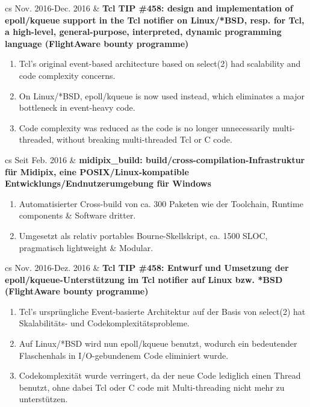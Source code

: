 \documentclass{article}
\begin{document}
\begin{table}
{\begin{enumerate}
    \end{enumerate}
    \begin{tabularx}{\linewidth}{cs}
      Nov. 2016-Dec. 2016 & \bf{Tcl TIP \#458: design and implementation of epoll/kqueue support in the Tcl notifier on Linux/*BSD, resp. for Tcl, a high-level, general-purpose, interpreted, dynamic programming language (FlightAware bounty programme)}
    \end{tabularx}
    \begin{enumerate}
      \item Tcl's original event-based architecture based on select(2) had scalability and code complexity concerns.
      \item On Linux/*BSD, epoll/kqueue is now used instead, which eliminates a major bottleneck in event-heavy code.
      \item Code complexity was reduced as the code is no longer unnecessarily multi-threaded, without breaking multi-threaded Tcl or C code.
    \end{enumerate}
  }{
    \caption{Projektbeteiligungen}
    \begin{tabularx}{\linewidth}{cs}
      Seit Feb. 2016 & \bf{midipix\_build: build/cross-compilation-Infrastruktur für Midipix, eine POSIX/Linux-kompatible Entwicklungs/Endnutzerumgebung für Windows}
    \end{tabularx}
    \begin{enumerate}
      \item Automatisierter Cross-build von ca. 300 Paketen wie der Toolchain, Runtime components \& Software dritter.
      \item Umgesetzt als relativ portables Bourne-Skellskript, ca. 1500 SLOC, pragmatisch lightweight \& Modular.
    \end{enumerate}
    \begin{tabularx}{\linewidth}{cs}
      Nov. 2016-Dez. 2016 & \bf{Tcl TIP \#458: Entwurf und Umsetzung der epoll/kqueue-Unterstützung im Tcl notifier auf Linux bzw. *BSD (FlightAware bounty programme)}
    \end{tabularx}
    \begin{enumerate}
      \item Tcl's ursprüngliche Event-basierte Architektur auf der Basis von select(2) hat Skalabilitäts- und Codekomplexitätsprobleme.
      \item Auf Linux/*BSD wird nun epoll/kqueue benutzt, wodurch ein bedeutender Flaschenhals in I/O-gebundenem Code eliminiert wurde.
      \item Codekomplexität wurde verringert, da der neue Code lediglich einen Thread benutzt, ohne dabei Tcl oder C code mit Multi-threading nicht mehr zu unterstützen.

\end{enumerate}}
\end{table}
\end{document}
